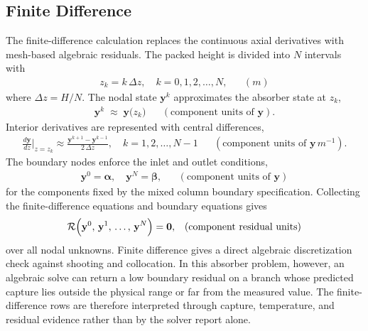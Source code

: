         \subsection{Finite Difference}
            The finite-difference calculation replaces the continuous axial derivatives with mesh-based algebraic residuals. The packed height is divided into $N$ intervals with
                \begin{align}
                    z_k = k\,\Delta z, \quad k = 0, 1, 2, \ldots, N,
                    && \left(\unit{m}\right)
                \end{align}
                where $\Delta z=H/N$. The nodal state $\mathbf{y}^k$ approximates the absorber state at $z_k$,
                \begin{align}
                    \mathbf{y}^k \;\approx\; \mathbf{y}\bigl(z_k\bigr)
                    && \left(\text{component units of }\mathbf{y}\right).
                \end{align}
                Interior derivatives are represented with central differences,
                \begin{align}
                    \frac{d \mathbf{y}}{dz}\biggr\rvert_{z=z_k}
                    \approx
                    \frac{\mathbf{y}^{k+1} - \mathbf{y}^{k-1}}{2\,\Delta z},
                    \quad
                    k = 1, 2, \ldots, N-1
                    && \left(\text{component units of }\mathbf{y}\,\unit{m^{-1}}\right).
                \end{align}
                The boundary nodes enforce the inlet and outlet conditions,
                \begin{align}
                    \mathbf{y}^0 = \boldsymbol{\alpha},
                    \quad
                    \mathbf{y}^N = \boldsymbol{\beta},
                    && \left(\text{component units of }\mathbf{y}\right)
                \end{align}
                for the components fixed by the mixed column boundary specification. Collecting the finite-difference equations and boundary equations gives
                \begin{align}
                    \mathcal{R}\Bigl(\mathbf{y}^0,\, \mathbf{y}^1,\, \dots,\, \mathbf{y}^N\Bigr)
                    = \mathbf{0},
                    && \left(\text{component residual units}\right)
                \end{align}
                over all nodal unknowns. Finite difference gives a direct algebraic discretization check against shooting and collocation. In this absorber problem, however, an algebraic solve can return a low boundary residual on a branch whose predicted capture lies outside the physical range or far from the measured value. The finite-difference rows are therefore interpreted through capture, temperature, and residual evidence rather than by the solver report alone.

